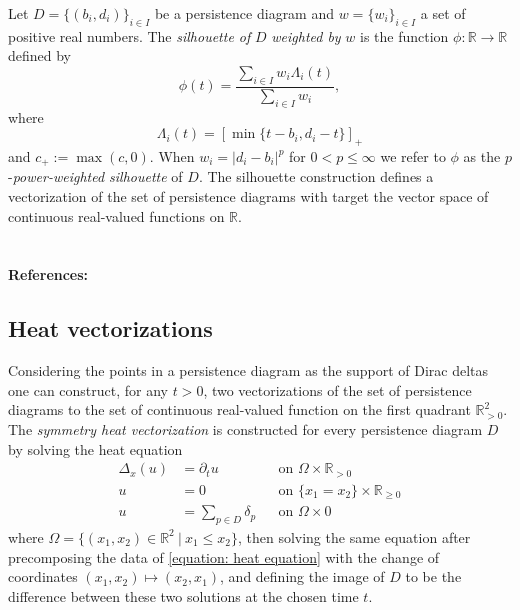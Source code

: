 \documentclass{amsart}
\begin{document}
	Let $D = \{(b_i, d_i)\}_{i \in I}$ be a
	persistence diagram and $w = \{w_i\}_{i \in I}$ a set of positive real numbers. The \textit{silhouette of} $D$ \textit{weighted by} $w$ is the function $\phi : \mathbb R \to \mathbb R$ defined by
	\begin{equation*}	
	\phi(t) = \frac{\sum_{i \in I}w_i \Lambda_i(t)}{\sum_{i \in I}w_i},	
	\end{equation*}	
	where	
	\begin{equation*}
	\Lambda_i(t) = \left[ \min \{t-b_i, d_i-t\}\right]_+	
	\end{equation*}	
	and $c_+ := \max(c,0)$. When $w_i = \vert d_i - b_i \vert^p$ for $0 < p \leq \infty$ we refer to $\phi$ as the $p$-\textit{power-weighted silhouette} of $D$. The silhouette construction defines a
	vectorization of the set of persistence diagrams with target the vector space of continuous real-valued functions on $\mathbb R$.
	
	\paragraph{\\ References:} \cite{chazal2014stochastic}
	
	\subsection*{Heat vectorizations} \label{heat_vectorization}
	
	Considering the points in a persistence diagram as the support of Dirac deltas one can construct, for any $t > 0$,
	two vectorizations of the set of persistence diagrams to the set of continuous real-valued function on the first quadrant $\mathbb{R}^2_{>0}$. The \textit{symmetry heat vectorization} is constructed for every persistence diagram $D$ by solving the heat equation
	\begin{align} \label{equation: heat equation}
	\Delta_x(u) &= \partial_t u && \text{on } \Omega \times \mathbb R_{>0} \nonumber \\
	u &= 0 && \text{on } \{x_1 = x_2\} \times \mathbb R_{\geq 0} \\
	u &= \sum_{p \in D} \delta_p && \text{on } \Omega \times {0} \nonumber
	\end{align}
	where $\Omega = \{(x_1, x_2) \in \mathbb R^2\ |\ x_1 \leq x_2\}$, then solving the same equation after precomposing the data of \eqref{equation: heat equation} with the change of coordinates $(x_1, x_2) \mapsto (x_2, x_1)$, and defining the image of $D$ to be the difference between these two solutions at the chosen time $t$.
	
\end{document}
